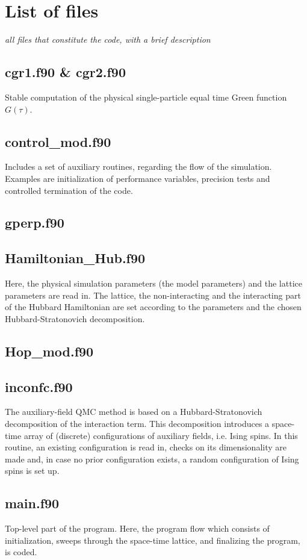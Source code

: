 \section{List of files}
\textit{all files that constitute the code, with a brief description}
\subsection{cgr1.f90 \& cgr2.f90}
Stable computation of the physical single-particle equal time Green function $G(\tau)$.
\clearpage
\subsection{control\_mod.f90}
Includes a set of auxiliary routines, regarding the flow of the simulation. 
Examples are initialization of performance variables, precision tests and controlled termination of the code.
\clearpage
\subsection{gperp.f90}
\clearpage
\subsection{Hamiltonian\_Hub.f90}
Here, the physical simulation parameters (the model parameters) and the lattice parameters are read in. 
The lattice, the non-interacting and the interacting part of the Hubbard Hamiltonian are set according to the parameters and the chosen Hubbard-Stratonovich decomposition.
\clearpage
\subsection{Hop\_mod.f90}
\clearpage
\subsection{inconfc.f90}
The auxiliary-field QMC method is based on a Hubbard-Stratonovich decomposition of the interaction term. This decomposition introduces a space-time array of (discrete) configurations of auxiliary fields, i.e. Ising spins. 
In this routine, an existing configuration is read in, checks on its dimensionality are made and, in case no prior configuration exists, a random configuration of Ising spins is set up.
\clearpage
\subsection{main.f90}
Top-level part of the program. Here, the program flow which consists of initialization, sweeps through the space-time lattice, and finalizing the program, is coded.
\clearpage
